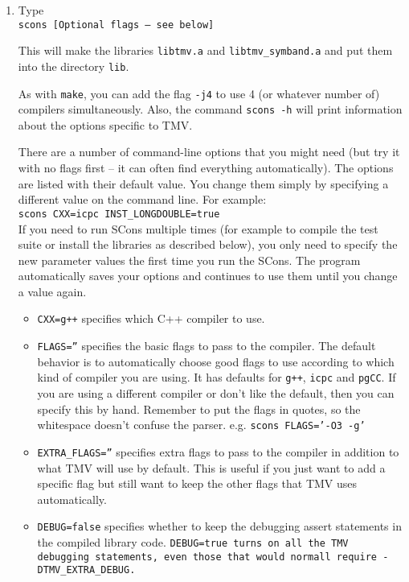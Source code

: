 \begin{enumerate}

\item Type \\
\texttt{scons [Optional flags -- see below]}

This will make the libraries \texttt{libtmv.a} and \texttt{libtmv\_symband.a}
and put them into the directory \texttt{lib}. 

As with \texttt{make}, you can add
the flag \texttt{-j4} to use 4 (or whatever number of) compilers simultaneously.
Also, the command \texttt{scons -h} will print information
about the options specific to TMV.

There are a number of command-line options that you might need (but try it with no flags
first -- it can often find everything automatically).  
The options are listed 
with their default value.  You change them simply by specifying a different value
on the command line.  For example:\\
\texttt{scons CXX=icpc INST\_LONGDOUBLE=true}\\
If you need to run SCons multiple times (for example to compile the test suite or install
the libraries as described below), you only need to specify the new parameter values the first
time you run the SCons.
The program automatically saves your options and continues to use them until you
change a value again.
\begin{itemize}
\item \texttt{CXX=g++} specifies which C++ compiler to use.
\item \texttt{FLAGS=''} specifies the basic flags to pass to the compiler.  The default behavior is to
automatically choose good flags to use according to which kind of compiler you are using.
It has defaults for \texttt{g++}, \texttt{icpc} and \texttt{pgCC}.  If you are using a different compiler or don't
like the default, then you can specify this by hand.  
Remember to put the flags in quotes,
so the whitespace doesn't confuse the parser.  e.g. \texttt{scons FLAGS='-O3 -g'}
\item \texttt{EXTRA\_FLAGS=''} specifies extra flags to pass to the compiler in addition to what TMV will use by default.  This is useful if you just want to add a specific flag but still want to keep the other flags that TMV uses automatically.
\item \texttt{DEBUG=false} specifies whether to keep the debugging assert statements in the compiled library code.  \tt{DEBUG=true} turns on all the TMV debugging statements, even those that would normall require \tt{-DTMV\_EXTRA\_DEBUG}.

\end{itemize}
\end{enumerate}
